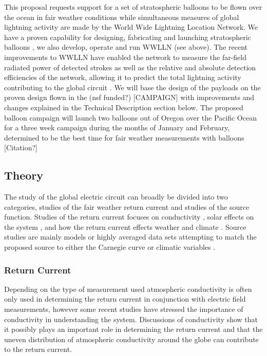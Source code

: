 This proposal requests support for a set of stratospheric balloons to be flown over the ocean in fair weather conditions while simultaneous measures of global lightning activity are made by the World Wide Lightning Location Network.
We have a proven capability for designing, fabricating and launching stratospheric balloons \citep{Holzworth2005,Thomas2004,Holzworth1985}, we also develop, operate and run WWLLN (see above).
The recent improvements to WWLLN have enabled the network to measure the far-field radiated power of detected strokes as well as the relative and absolute detection efficiencies of the network, allowing it to predict the total lightning activity contributing to the global circuit \citep{Hutchins2011}.
We will base the design of the payloads on the proven design flown in the (nsf funded?) [CAMPAIGN] with improvements and changes explained in the Technical Description section below.
The proposed balloon campaign will launch two balloons out of Oregon over the Pacific Ocean for a three week campaign during the months of January and February, determined to be the best time for fair weather measurements with balloons [Citation?]

\subsection*{Theory}

The study of the global electric circuit can broadly be divided into two categories, studies of the fair weather return current and studies of the source function.
Studies of the return current focuses on conductivity \citep{Rycroft2008}, solar effects on the system \citep{Tinsley2007}, and how the return current effects weather and climate \citep{Kniveton2008}.
Source studies are mainly models or highly averaged data sets attempting to match the proposed source to either the Carnegie curve or climatic variables \citep{Liu2010}.

\subsubsection*{Return Current}

Depending on the type of measurement used atmospheric conductivity is often only used in determining the return current in conjunction with electric field measurements, however some recent studies \citep{Rycroft2008} have stressed the importance of conductivity in understanding the system.
Discussions of conductivity show that it possibly plays an important role in determining the return current and that the uneven distribution of atmospheric conductivity around the globe can contribute to the return current.

